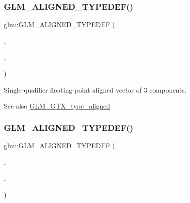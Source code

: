 \subsubsection{\texorpdfstring{G\+L\+M\+\_\+\+A\+L\+I\+G\+N\+E\+D\+\_\+\+T\+Y\+P\+E\+D\+E\+F()}{GLM\_ALIGNED\_TYPEDEF()}\hspace{0.1cm}{\footnotesize\ttfamily [153/209]}}
{\footnotesize\ttfamily glm\+::\+G\+L\+M\+\_\+\+A\+L\+I\+G\+N\+E\+D\+\_\+\+T\+Y\+P\+E\+D\+EF (\begin{DoxyParamCaption}\item[{\mbox{\hyperlink{group__gtc__type__precision_ga4d08db2a75d1e8f85e0edbbd76f18ecf}{f32vec3}}}]{,  }\item[{aligned\+\_\+f32vec3}]{,  }\item[{16}]{ }\end{DoxyParamCaption})}

Single-\/qualifier floating-\/point aligned vector of 3 components. \begin{DoxySeeAlso}{See also}
\mbox{\hyperlink{group__gtx__type__aligned}{G\+L\+M\+\_\+\+G\+T\+X\+\_\+type\+\_\+aligned}} 
\end{DoxySeeAlso}
\mbox{\label{group__gtx__type__aligned_ga2e8a12c5e6a9c4ae4ddaeda1d1cffe3b}} 
\subsubsection{\texorpdfstring{G\+L\+M\+\_\+\+A\+L\+I\+G\+N\+E\+D\+\_\+\+T\+Y\+P\+E\+D\+E\+F()}{GLM\_ALIGNED\_TYPEDEF()}\hspace{0.1cm}{\footnotesize\ttfamily [154/209]}}
{\footnotesize\ttfamily glm\+::\+G\+L\+M\+\_\+\+A\+L\+I\+G\+N\+E\+D\+\_\+\+T\+Y\+P\+E\+D\+EF (\begin{DoxyParamCaption}\item[{\mbox{\hyperlink{group__gtc__type__precision_ga03e165a8b1ffe77625530fa335699e06}{f32vec4}}}]{,  }\item[{aligned\+\_\+f32vec4}]{,  }\item[{16}]{ }\end{DoxyParamCaption})}

